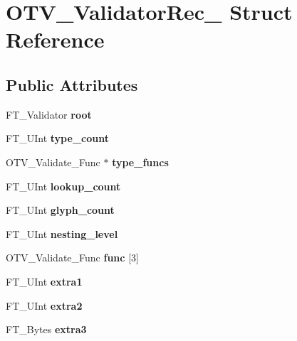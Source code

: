\hypertarget{struct_o_t_v___validator_rec__}{}\section{O\+T\+V\+\_\+\+Validator\+Rec\+\_\+ Struct Reference}
\label{struct_o_t_v___validator_rec__}
\subsection*{Public Attributes}
\begin{DoxyCompactItemize}
\item 
\mbox{\label{struct_o_t_v___validator_rec___a89ef8c9a858359cd73e768add1a15d25}} 
F\+T\+\_\+\+Validator {\bfseries root}
\item 
\mbox{\label{struct_o_t_v___validator_rec___aeed5ebe706c48203dba5420a95617a82}} 
F\+T\+\_\+\+U\+Int {\bfseries type\+\_\+count}
\item 
\mbox{\label{struct_o_t_v___validator_rec___a3b4a41f08b7921e6cc2f5e4e23b5011b}} 
O\+T\+V\+\_\+\+Validate\+\_\+\+Func $\ast$ {\bfseries type\+\_\+funcs}
\item 
\mbox{\label{struct_o_t_v___validator_rec___a4e8f98560f1b7ebc022edc738ee80fae}} 
F\+T\+\_\+\+U\+Int {\bfseries lookup\+\_\+count}
\item 
\mbox{\label{struct_o_t_v___validator_rec___a4f9b4d55fb9803ac6a7b69080f8810eb}} 
F\+T\+\_\+\+U\+Int {\bfseries glyph\+\_\+count}
\item 
\mbox{\label{struct_o_t_v___validator_rec___ae2d4670d8fe74963222fc84cb987e487}} 
F\+T\+\_\+\+U\+Int {\bfseries nesting\+\_\+level}
\item 
\mbox{\label{struct_o_t_v___validator_rec___accfa14c1c69bf5b2321e6e385f69f72e}} 
O\+T\+V\+\_\+\+Validate\+\_\+\+Func {\bfseries func} \mbox{[}3\mbox{]}
\item 
\mbox{\label{struct_o_t_v___validator_rec___a3c81f375dbadb11c4a4629f917774849}} 
F\+T\+\_\+\+U\+Int {\bfseries extra1}
\item 
\mbox{\label{struct_o_t_v___validator_rec___a99781817034907744af431c7d8a38171}} 
F\+T\+\_\+\+U\+Int {\bfseries extra2}
\item 
\mbox{\label{struct_o_t_v___validator_rec___acd900be55e5a4a805eca495fe2b5e0ed}} 
F\+T\+\_\+\+Bytes {\bfseries extra3}
\end{DoxyCompactItemize}



